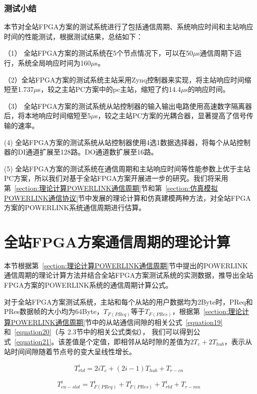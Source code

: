 \subsubsection{测试小结}
本节对全站FPGA方案的测试系统进行了包括通信周期、系统响应时间和主站响应时间的性能测试，根据测试结果，总结如下：

（1） 全站FPGA方案的测试系统在5个节点情况下，可以在50$\mu$s通信周期下运行，系统全局响应时间为160$\mu$s。

（2）全站FPGA方案的测试系统主站采用Zynq控制器来实现，将主站响应时间缩短至1.737$\mu$s，较之主站PC方案中的pc主站，缩短了约14.4$\mu$s的响应时间。

（3） 全站FPGA方案的测试系统从站控制器的输入输出电路使用高速数字隔离器后，将本地响应时间缩短至5$\mu$s，较之主站PC方案的光耦合器，显著提高了信号传输的速率。

 (4) 全站FPGA方案的测试系统从站控制器使用4选1数据选择器，将每个从站控制器的DI通道扩展至128路。DO通道数扩展至16路。
 
 (5) 全站FPGA方案的测试系统在通信周期和主站响应时间等性能参数上优于主站PC方案，所以我们对基于全站FPGA方案开展进一步的研究。我们将采用第~\ref{section:理论计算POWERLINK通信周期}节和第~\ref{section:仿真模拟POWERLINK通信协议}节中发展的理论计算和仿真建模两种方法，对全站FPGA方案的POWERLINK系统通信周期进行估算。


\section{全站FPGA方案通信周期的理论计算}
\label{section:全站FPGA方案通信周期的理论计算}

本节根据第~\ref{section:理论计算POWERLINK通信周期}节中提出的POWERLINK通信周期的理论计算方法并结合全站FPGA方案测试系统的实测数据，推导出全站FPGA方案的POWERLINK系统的通信周期计算公式。

对于全站FPGA方案测试系统，主站和每个从站的用户数据均为2Byte时，PReq和PRes数据帧的大小均为64Byte，$T_{F(PReq)}$等于$T_{F(PRes)}$，根据第~\ref{section:理论计算POWERLINK通信周期}节中的从站通信间隙的相关公式~\ref{equation19}和~\ref{equation20}（与 2.3节中的相关公式类似）， 我们可以得到公式~\ref{equation21}。该差值是个定值，即相邻从站时隙的差值为$2T_{c}+2T_{hub}$，表示从站时间间隙随着节点号的变大呈线性增长。

\begin{equation}
\label{equation19}
T_{rtd}^{i}=2iT_{c}+(2i-1)T_{hub}+T_{r-cn}
\end{equation}

\begin{equation}
\label{equation20}
T_{cn-slot}^{i}=T_{F(PReq)}^{i}+T_{F(PRes)}^{i}+T_{rtd}^{i}+T_{r-mn}
\end{equation}

